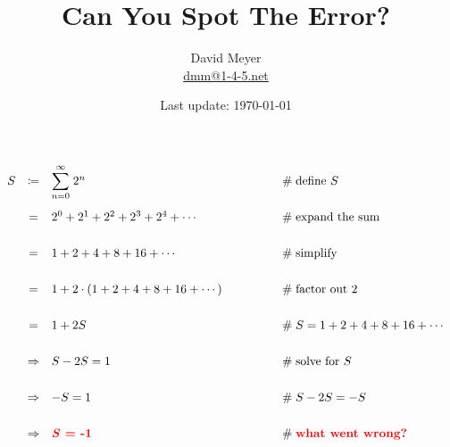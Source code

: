 \documentclass[11pt, oneside]{article}
\title{Can You Spot The Error?}
\author{David Meyer \\ \href{mailto:dmm@1-4-5.net}{dmm@1-4-5.net}}
\date{Last update: \today}
\begin{document}
\maketitle


\bigskip
\Large {
  \begin{equation*}
   \begin{array}{rcll} 
S
&\coloneqq& {\mathlarger \sum\limits_{n = 0}^{\infty}} \; 2^n	&\qquad \qquad \mathrel{\#} \text{define $S$} \\
[18pt]
&=& 2^0 + 2^1 + 2^2 + 2^3 + 2^4 + \cdots 						&\qquad \qquad  \mathrel{\#} \text{expand the sum} \\
[18pt]
&=& 1 + 2 + 4 + 8 + 16 + \cdots 								&\qquad \qquad  \mathrel{\#} \text{simplify} \\
[18pt]
&=& 1 + 2 \cdot (1 + 2 + 4 + 8 + 16 + \cdots)					&\qquad \qquad \mathrel{\#} \text{factor out $2$} \\
[18pt]
&=& 1 + 2S														&\qquad \qquad \mathrel{\#} S = 1 + 2 + 4 + 8 + 16 + \cdots \\
[18pt]
&\Rightarrow& S - 2S = 1										&\qquad \qquad \mathrel{\#} \text{solve for $S$} \\
[18pt]
&\Rightarrow& -S = 1                            				&\qquad \qquad \mathrel{\#} S - 2S = -S \\
[18pt]
&\Rightarrow& \text{\bf \color{red}{\emph{S} = -1}}				&\qquad \qquad \mathrel{\#} \text{{\bf \color{red}{what went wrong?}}}
\end{array}
\end{equation*}
}
\end{document}
